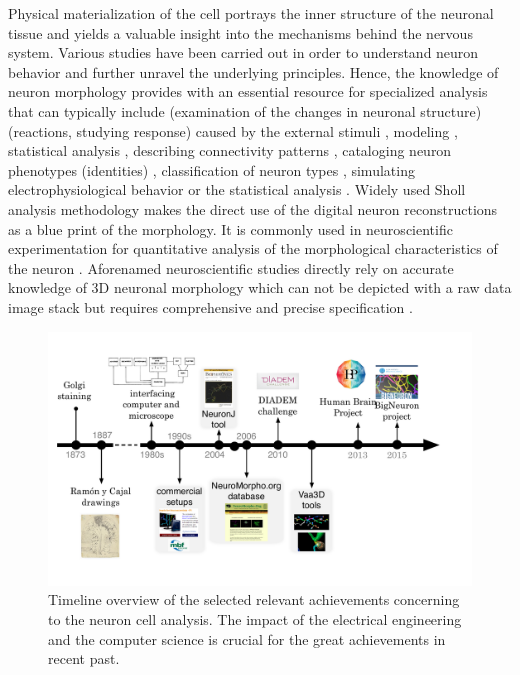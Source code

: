 Physical materialization of the cell portrays the inner structure of the neuronal tissue and yields a valuable insight into the mechanisms behind the nervous system. Various studies have been carried out in order to understand neuron behavior and further unravel the underlying principles. Hence, the knowledge of neuron morphology provides with an essential resource for specialized analysis that can typically include (examination of the changes in neuronal structure) (reactions, studying response) caused by the external stimuli \cite{gomez2007immobilized,koppes2011neurite}, modeling \cite{ascoli2001computer}, statistical analysis \cite{polavaram2014statistical}, describing connectivity patterns \cite{}, cataloging neuron phenotypes (identities) \cite{defelipe2013new}, classification of neuron types \cite{armananzas2015towards}, simulating electrophysiological behavior \cite{} or the statistical analysis \cite{samsonovich2005statistical}. Widely used Sholl analysis methodology \cite{sholl1953dendritic} makes the direct use of the digital neuron reconstructions as a blue print of the morphology. It is commonly used in neuroscientific experimentation for quantitative analysis of the morphological characteristics of the neuron \cite{garcia2014new}. Aforenamed neuroscientific studies directly rely on accurate knowledge of 3D neuronal morphology which can not be depicted with a raw data image stack but requires comprehensive and precise specification \cite{parekh2013neuronal}.

\begin{figure}
	\begin{center}
		\includegraphics[width=\textwidth]{ch1_fig1}
	\end{center}
	\caption{Timeline overview of the selected relevant achievements concerning to the neuron cell analysis. The impact of the electrical engineering and the computer science is crucial for the great achievements in recent past.}
	\label{ch1_fig1}
\end{figure}

